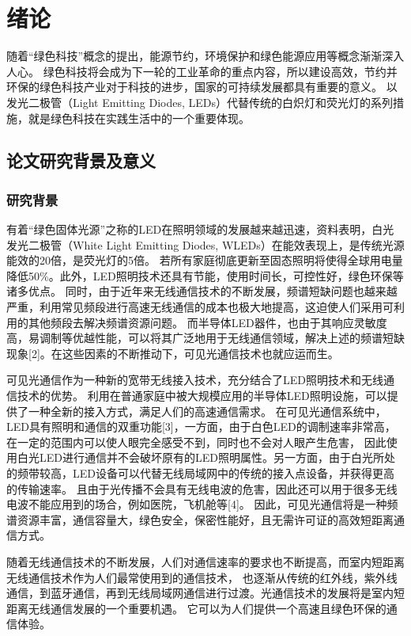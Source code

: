 
\chapter{绪论}\label{chap:introduction}
随着“绿色科技”概念的提出，能源节约，环境保护和绿色能源应用等概念渐渐深入人心。
绿色科技将会成为下一轮的工业革命的重点内容，所以建设高效，节约并环保的绿色科技产业对于科技的进步，国家的可持续发展都具有重要的意义。
以发光二极管（Light Emitting Diodes, LEDs）代替传统的白炽灯和荧光灯的系列措施，就是绿色科技在实践生活中的一个重要体现。

\section{论文研究背景及意义}\label{sec:background}
\subsection{研究背景}
有着“绿色固体光源”之称的LED在照明领域的发展越来越迅速，资料表明，白光发光二极管（White Light Emitting Diodes, WLEDs）在能效表现上，是传统光源能效的20倍，是荧光灯的5倍。
若所有家庭彻底更新至固态照明将使得全球用电量降低50\%\cite{Xuwei2005}。此外，LED照明技术还具有节能，使用时间长，可控性好，绿色环保等诸多优点。
同时，由于近年来无线通信技术的不断发展，频谱短缺问题也越来越严重，利用常见频段进行高速无线通信的成本也极大地提高，这迫使人们采用可利用的其他频段去解决频谱资源问题。
而半导体LED器件，也由于其响应灵敏度高，易调制等优越性能，可以将其广泛地用于无线通信领域，解决上述的频谱短缺现象[2]。在这些因素的不断推动下，可见光通信技术也就应运而生。

可见光通信作为一种新的宽带无线接入技术，充分结合了LED照明技术和无线通信技术的优势。
利用在普通家庭中被大规模应用的半导体LED照明设施，可以提供了一种全新的接入方式，满足人们的高速通信需求。
在可见光通信系统中，LED具有照明和通信的双重功能[3]，一方面，由于白色LED的调制速率非常高，在一定的范围内可以使人眼完全感受不到，同时也不会对人眼产生危害，
因此使用白光LED进行通信并不会破坏原有的LED照明属性。另一方面，由于白光所处的频带较高，LED设备可以代替无线局域网中的传统的接入点设备，并获得更高的传输速率。
且由于光传播不会具有无线电波的危害，因此还可以用于很多无线电波不能应用到的场合，例如医院，飞机舱等[4]。
因此，可见光通信将是一种频谱资源丰富，通信容量大，绿色安全，保密性能好，且无需许可证的高效短距离通信方式。

随着无线通信技术的不断发展，人们对通信速率的要求也不断提高，而室内短距离无线通信技术作为人们最常使用到的通信技术，
也逐渐从传统的红外线，紫外线通信，到蓝牙通信，再到无线局域网通信进行过渡。光通信技术的发展将是室内短距离无线通信发展的一个重要机遇。
它可以为人们提供一个高速且绿色环保的通信体验。

